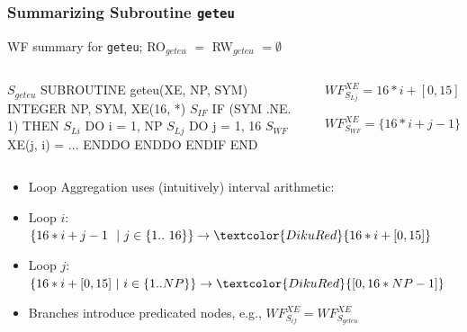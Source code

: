 \documentclass{beamer}
\renewcommand{\emph}[1]{\textcolor{structure}{#1}}
\newcommand{\emp}[1]{\textcolor{DikuRed}{ #1}}
\newcommand{\mymath}[1]{$ #1 $}
\newcommand{\myindx}[1]{_{#1}}
\newcommand{\myindu}[1]{^{#1}}
\begin{document}
\begin{frame}[fragile,t]
  \frametitle{Summarizing Subroutine {\tt geteu}}

\begin{block}{WF summary for {\tt geteu}; RO$_{geteu}$ $=$ RW$_{geteu}$ $= \emptyset$ } \vspace{-1ex}
\begin{columns} 
\begin{colorcode}[fontsize=\scriptsize]
\mymath{S\myindx{geteu}}  SUBROUTINE geteu(XE, NP, SYM)
         INTEGER NP, SYM, XE(16, *)  
\mymath{S\myindx{IF}}       \emph{IF (SYM .NE. 1) THEN}
\mymath{S\myindx{Li}}         \emp{DO i = 1, NP}
\mymath{S\myindx{Lj}}           \emp{DO j = 1, 16}
\mymath{S\myindx{WF}}             \alert{XE(j, i)} = ...
             \emp{ENDDO} 
           \emp{ENDDO}
         \emph{ENDIF}
       END
\end{colorcode}
\begin{colorcode}[fontsize=\scriptsize]

\emp{\mymath{WF\myindu{XE}\myindx{S\myindx{Lj}} = 16*i + [0,15]}}

\alert{\mymath{WF\myindu{XE}\myindx{S\myindx{WF}} = \{16*i+j-1\}}}
\end{colorcode}
\end{columns}
\end{block}


\begin{itemize}
    \item Loop Aggregation uses (intuitively) interval arithmetic: \smallskip
    \item Loop $i$: $\{16*i + j - 1 \mbox{ }\mbox{ }|\mbox{ } j \in \{1..\mbox{ }16\}\} \rightarrow \emp{16*i + [0,15]}$ \smallskip
    \item Loop $j$: $\{16*i + [0,15] \mbox{ }|\mbox{ } i \in \{1..NP\}\} \rightarrow \emp{[0, 16*NP-1]}$  \smallskip
    \item Branches introduce predicated nodes, e.g., \emph{$WF^{XE}_{S_{if}} = WF^{XE}_{S_{geteu}}$} 
\end{itemize}
\end{frame}


\end{document}
